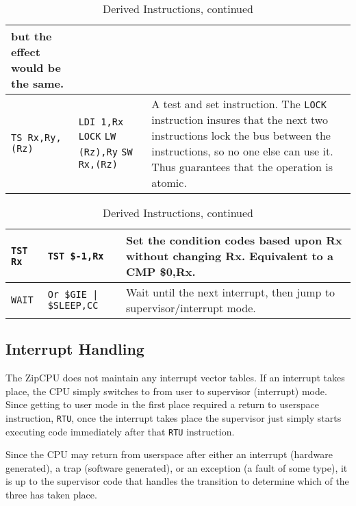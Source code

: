 \documentclass{gqtekspec}
\begin{document}
\begin{table}
\begin{center}
\begin{tabular}{p{1.0in}p{1.5in}p{3.2in}}
	but the effect would be the same. \\\hline
{\tt TS Rx,Ry,(Rz)}
	& \hbox{\tt LDI 1,Rx}
		\hbox{\tt LOCK}
		\hbox{\tt LW (Rz),Ry}
		\hbox{\tt SW Rx,(Rz)}
	& A test and set instruction.  The {\tt LOCK} instruction insures
	that the next two instructions lock the bus between the instructions,
	so no one else can use it.  Thus guarantees that the operation is
	atomic.
	\\\hline
%
%
\end{tabular}
\caption{Derived Instructions, continued}\label{tbl:derived-3}
\end{center}\end{table}
\begin{table}\begin{center}
\begin{tabular}{p{1.0in}p{1.5in}p{3in}}\\\hline
{\tt TST Rx}
	& {\tt TST \$-1,Rx}
	& Set the condition codes based upon Rx without changing Rx.
	Equivalent to a CMP \$0,Rx.\\\hline
{\tt WAIT}
	& {\tt Or \$GIE | \$SLEEP,CC}
	& Wait until the next interrupt, then jump to supervisor/interrupt
	mode.
\end{tabular}
\caption{Derived Instructions, continued}\label{tbl:derived-4}
\end{center}\end{table}

\subsection{Interrupt Handling}
The ZipCPU does not maintain any interrupt vector tables.  If an interrupt
takes place, the CPU simply switches to from user to supervisor (interrupt)
mode.  Since getting to user mode in the first place required a return to
userspace instruction, {\tt RTU}, once the interrupt takes place the 
supervisor just simply starts executing code immediately after that
{\tt RTU} instruction.

Since the CPU may return from userspace after either an interrupt (hardware
generated), a trap (software generated), or an exception (a fault of some
type), it is up to the supervisor code that handles the transition to
determine which of the three has taken place.
\end{document}
